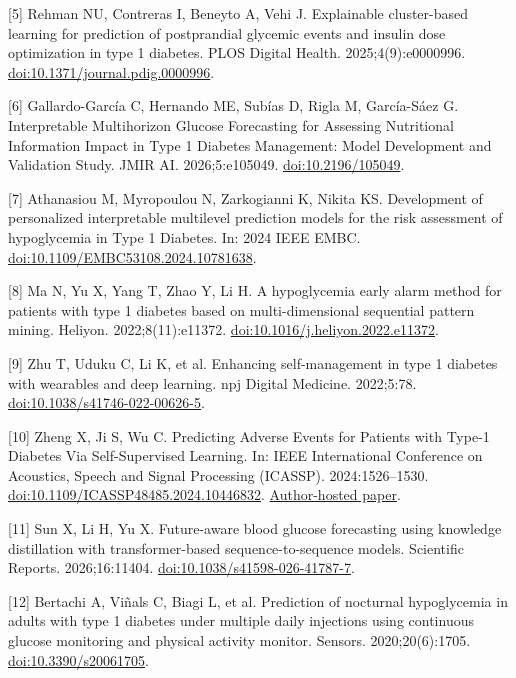 \documentclass[11pt,a4paper]{article}
\begin{document}
[5] Rehman NU, Contreras I, Beneyto A, Vehi J. Explainable cluster-based learning for prediction of postprandial glycemic events and insulin dose optimization in type 1 diabetes. PLOS Digital Health. 2025;4(9):e0000996. \href{https://doi.org/10.1371/journal.pdig.0000996}{doi:10.1371/journal.pdig.0000996}.

[6] Gallardo-García C, Hernando ME, Subías D, Rigla M, García-Sáez G. Interpretable Multihorizon Glucose Forecasting for Assessing Nutritional Information Impact in Type 1 Diabetes Management: Model Development and Validation Study. JMIR AI. 2026;5:e105049. \href{https://doi.org/10.2196/105049}{doi:10.2196/105049}.

[7] Athanasiou M, Myropoulou N, Zarkogianni K, Nikita KS. Development of personalized interpretable multilevel prediction models for the risk assessment of hypoglycemia in Type 1 Diabetes. In: 2024 IEEE EMBC. \href{https://doi.org/10.1109/EMBC53108.2024.10781638}{doi:10.1109/EMBC53108.2024.10781638}.

[8] Ma N, Yu X, Yang T, Zhao Y, Li H. A hypoglycemia early alarm method for patients with type 1 diabetes based on multi-dimensional sequential pattern mining. Heliyon. 2022;8(11):e11372. \href{https://doi.org/10.1016/j.heliyon.2022.e11372}{doi:10.1016/j.heliyon.2022.e11372}.

[9] Zhu T, Uduku C, Li K, et al. Enhancing self-management in type 1 diabetes with wearables and deep learning. npj Digital Medicine. 2022;5:78. \href{https://doi.org/10.1038/s41746-022-00626-5}{doi:10.1038/s41746-022-00626-5}.

[10] Zheng X, Ji S, Wu C. Predicting Adverse Events for Patients with Type-1 Diabetes Via Self-Supervised Learning. In: IEEE International Conference on Acoustics, Speech and Signal Processing (ICASSP). 2024:1526--1530. \href{https://doi.org/10.1109/ICASSP48485.2024.10446832}{doi:10.1109/ICASSP48485.2024.10446832}. \href{https://sijieji.github.io/pdf/Glucose_Prediction_ICASSP_2024.pdf}{Author-hosted paper}.

[11] Sun X, Li H, Yu X. Future-aware blood glucose forecasting using knowledge distillation with transformer-based sequence-to-sequence models. Scientific Reports. 2026;16:11404. \href{https://doi.org/10.1038/s41598-026-41787-7}{doi:10.1038/s41598-026-41787-7}.

[12] Bertachi A, Viñals C, Biagi L, et al. Prediction of nocturnal hypoglycemia in adults with type 1 diabetes under multiple daily injections using continuous glucose monitoring and physical activity monitor. Sensors. 2020;20(6):1705. \href{https://doi.org/10.3390/s20061705}{doi:10.3390/s20061705}.
\end{document}

